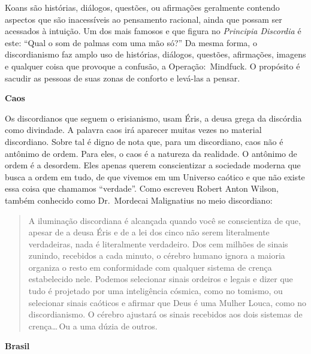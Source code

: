 Koans são histórias, diálogos, questões, ou afirmações geralmente contendo aspectos que são inacessíveis ao pensamento racional, ainda que possam ser acessados à intuição. Um dos mais famosos e que figura no \emph{Principia Discordia} é este: ``Qual o som de palmas com uma mão só?'' Da mesma forma, o discordianismo faz amplo uso de histórias, diálogos, questões, afirmações, imagens e qualquer coisa que provoque a confusão, a Operação:~Mindfuck. O propósito é sacudir as pessoas de suas zonas de conforto e levá-las a pensar.

\newpage
\begin{flushleft}
{\Large \textbf{Caos}}
\end{flushleft}

Os discordianos que seguem o erisianismo, usam Éris, a deusa grega da discórdia como divindade. A palavra caos irá aparecer muitas vezes no material discordiano. Sobre tal é digno de nota que, para um discordiano, caos não é antônimo de ordem. Para eles, o caos é a natureza da realidade. O antônimo de ordem é a desordem. Eles apenas querem conscientizar a sociedade moderna que busca a ordem em tudo, de que vivemos em um Universo caótico e que não existe essa coisa que chamamos ``verdade''. Como escreveu Robert Anton Wilson, também conhecido como Dr.~Mordecai Malignatius no meio discordiano:

	\begin{quote}
	{\small
	A iluminação discordiana é alcançada quando você se conscientiza de que, apesar de a deusa Éris e de a lei dos cinco não serem literalmente verdadeiras, nada é literalmente verdadeiro. Dos cem milhões de sinais zunindo, recebidos a cada minuto, o cérebro humano ignora a maioria organiza o resto em conformidade com qualquer sistema de crença estabelecido nele. Podemos selecionar sinais ordeiros e legais e dizer que tudo é projetado por uma inteligência cósmica, como no tomismo, ou selecionar sinais caóticos e afirmar que Deus é uma Mulher Louca, como no discordianismo. O cérebro ajustará os sinais recebidos aos dois sistemas de crença\ldots\,Ou a uma dúzia de outros.}
	\end{quote}
 
\begin{flushleft}
{\Large \textbf{Brasil}}
\end{flushleft}


